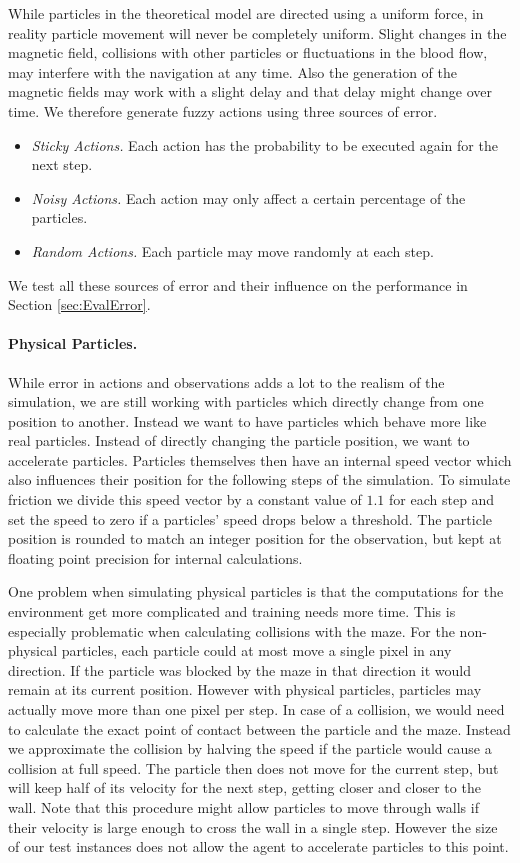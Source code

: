While particles in the theoretical model are directed using a uniform force, in reality particle movement will never be completely uniform. Slight changes in the magnetic field, collisions with other particles or fluctuations in the blood flow, may interfere with the navigation at any time. Also the generation of the magnetic fields may work with a slight delay and that delay might change over time. We therefore generate fuzzy actions using three sources of error.

\begin{itemize}
    \item \textit{Sticky Actions.} Each action has the probability to be executed again for the next step.
    \item \textit{Noisy Actions.} Each action may only affect a certain percentage of the particles.
    \item \textit{Random Actions.} Each particle may move randomly at each step.
\end{itemize}

We test all these sources of error and their influence on the performance in Section \ref{sec:EvalError}.

\paragraph{Physical Particles.}
While error in actions and observations adds a lot to the realism of the simulation, we are still working with particles which directly change from one position to another. Instead we want to have particles which behave more like real particles. Instead of directly changing the particle position, we want to accelerate particles. Particles themselves then have an internal speed vector which also influences their position for the following steps of the simulation. To simulate friction we divide this speed vector by a constant value of $1.1$ for each step and set the speed to zero if a particles' speed drops below a threshold. The particle position is rounded to match an integer position for the observation, but kept at floating point precision for internal calculations.

One problem when simulating physical particles is that the computations for the environment get more complicated and training needs more time. This is especially problematic when calculating collisions with the maze. For the non-physical particles, each particle could at most move a single pixel in any direction. If the particle was blocked by the maze in that direction it would remain at its current position. However with physical particles, particles may actually move more than one pixel per step. In case of a collision, we would need to calculate the exact point of contact between the particle and the maze. Instead we approximate the collision by halving the speed if the particle would cause a collision at full speed. The particle then does not move for the current step, but will keep half of its velocity for the next step, getting closer and closer to the wall. Note that this procedure might allow particles to move through walls if their velocity is large enough to cross the wall in a single step. However the size of our test instances does not allow the agent to accelerate particles to this point.


